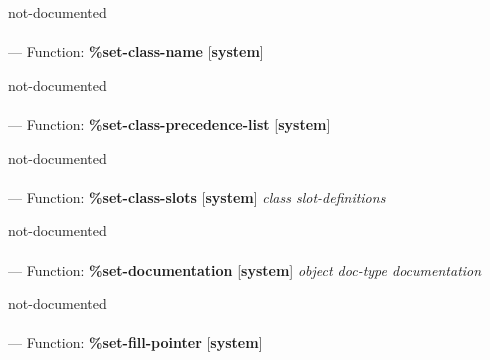 \begin{adjustwidth}{5em}{5em}
not-documented
\end{adjustwidth}

\paragraph{}
\label{SYSTEM:SET-CLASS-NAME}
--- Function: \textbf{\%set-class-name} [\textbf{system}] \textit{}

\begin{adjustwidth}{5em}{5em}
not-documented
\end{adjustwidth}

\paragraph{}
\label{SYSTEM:SET-CLASS-PRECEDENCE-LIST}
--- Function: \textbf{\%set-class-precedence-list} [\textbf{system}] \textit{}

\begin{adjustwidth}{5em}{5em}
not-documented
\end{adjustwidth}

\paragraph{}
\label{SYSTEM:SET-CLASS-SLOTS}
--- Function: \textbf{\%set-class-slots} [\textbf{system}] \textit{class slot-definitions}

\begin{adjustwidth}{5em}{5em}
not-documented
\end{adjustwidth}

\paragraph{}
\label{SYSTEM:SET-DOCUMENTATION}
--- Function: \textbf{\%set-documentation} [\textbf{system}] \textit{object doc-type documentation}

\begin{adjustwidth}{5em}{5em}
not-documented
\end{adjustwidth}

\paragraph{}
\label{SYSTEM:SET-FILL-POINTER}
--- Function: \textbf{\%set-fill-pointer} [\textbf{system}] \textit{}

